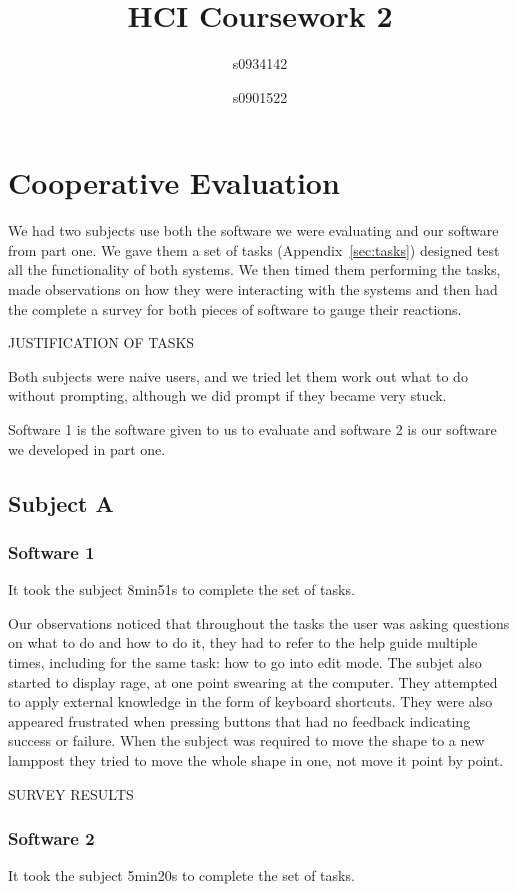 \documentclass[a4paper,11pt,oneside]{article}
\begin{document}
\title{HCI Coursework 2}
\author{s0934142 \and s0901522}
\maketitle

\section{Cooperative Evaluation}
We had two subjects use both the software we were evaluating and our software from part one.  We gave them a set of tasks (Appendix~\ref{sec:tasks}) designed test all the functionality of both systems.  We then timed them performing the tasks, made observations on how they were interacting with the systems and then had the complete a survey for both pieces of software to gauge their reactions.

JUSTIFICATION OF TASKS

Both subjects were naive users, and we tried let them work out what to do without prompting, although we did prompt if they became very stuck.

Software 1 is the software given to us to evaluate and software 2 is our software we developed in part one.

\subsection{Subject A}

\subsubsection{Software 1}
It took the subject 8min51s to complete the set of tasks. 

Our observations noticed that throughout the tasks the user was asking questions on what to do and how to do it, they had to refer to the help guide multiple times, including for the same task: how to go into edit mode.  The subjet also started to display rage, at one point swearing at the computer.  They attempted to apply external knowledge in the form of keyboard shortcuts.  They were also appeared frustrated when pressing buttons that had no feedback indicating success or failure.  When the subject was required to move the shape to a new lamppost they tried to move the whole shape in one, not move it point by point.

SURVEY RESULTS

\subsubsection{Software 2}
It took the subject 5min20s to complete the set of tasks.
\end{document}
